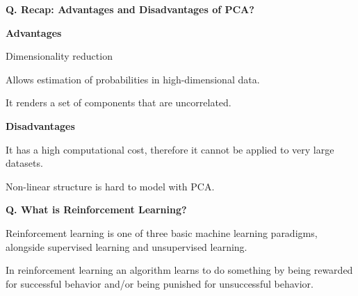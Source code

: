 \begin{frame}[fragile]{\textbf{Q. Recap: Advantages and Disadvantages of PCA?}}
  \vspace{.4em}
  \begin{wideitemize}
    \item \textbf{Advantages}
    \begin{wideitemize}
      \item Dimensionality reduction
      \item Allows estimation of probabilities in high-dimensional data.
      \item It renders a set of components that are uncorrelated.
    \end{wideitemize}
    \item \textbf{Disadvantages}
    \begin{wideitemize}
      \item It has a high computational cost, therefore it cannot be applied to
      very large datasets.
      \item Non-linear structure is hard to model with PCA.
    \end{wideitemize}
  \end{wideitemize}
\end{frame}

\begin{frame}[fragile]{\textbf{Q. What is Reinforcement Learning?}}
  \begin{wideitemize}
    \item Reinforcement learning is one of three basic machine learning paradigms, alongside
    supervised learning and unsupervised learning.
    \item In reinforcement learning an algorithm learns to do something by being
    rewarded for successful behavior and/or being punished for unsuccessful behavior.
  \end{wideitemize}
\end{frame}



